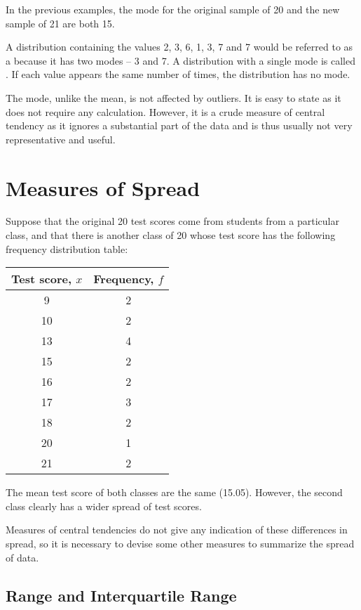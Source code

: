 In the previous examples, the mode for the original sample of 20 and the new sample of 21 are both 15.

A distribution containing the values 2, 3, 6, 1, 3, 7 and 7 would be referred to as a  because it has two modes -- 3 and 7. A distribution with a single mode is called . If each value appears the same number of times, the distribution has no mode.

The mode, unlike the mean, is not affected by outliers. It is easy to state as it does not require any calculation. However, it is a crude measure of central tendency as it ignores a substantial part of the data and is thus usually not very representative and useful.

\section{Measures of Spread}

Suppose that the original 20 test scores come from students from a particular class, and that there is another class of 20 whose test score has the following frequency distribution table:

\begin{center}
    \begin{tabular}{|c|c|}
    \hline
    \textbf{Test score, $x$} & \textbf{Frequency, $f$} \\ \hline\hline
    9 & 2 \\ \hline
    10 & 2 \\ \hline
    13 & 4 \\ \hline
    15 & 2 \\ \hline
    16 & 2 \\ \hline
    17 & 3 \\ \hline
    18 & 2 \\ \hline
    20 & 1 \\ \hline
    21 & 2 \\ \hline
    \end{tabular}
\end{center}

The mean test score of both classes are the same (15.05). However, the second class clearly has a wider spread of test scores.

Measures of central tendencies do not give any indication of these differences in spread, so it is necessary to devise some other measures to summarize the spread of data.

\subsection{Range and Interquartile Range}


